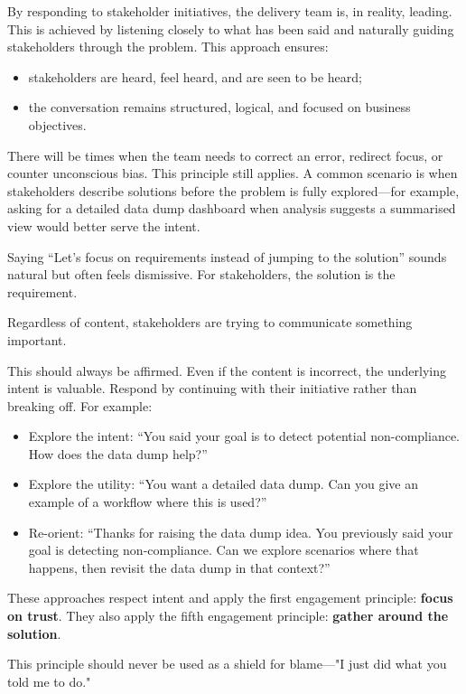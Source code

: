 \documentclass[10pt,openany,10pt]{book}
\providecommand{\tightlist}{%
  \setlength{\itemsep}{0pt}\setlength{\parskip}{0pt}}
\begin{document}
By responding to stakeholder initiatives, the delivery team is, in
reality, leading. This is achieved by listening closely to what has been
said and naturally guiding stakeholders through the problem. This
approach ensures:

\begin{itemize}
\tightlist
\item
  stakeholders are heard, feel heard, and are seen to be heard;
\item
  the conversation remains structured, logical, and focused on business
  objectives.
\end{itemize}

There will be times when the team needs to correct an error, redirect
focus, or counter unconscious bias. This principle still applies. A
common scenario is when stakeholders describe solutions before the
problem is fully explored---for example, asking for a detailed data dump
dashboard when analysis suggests a summarised view would better serve
the intent.

Saying ``Let's focus on requirements instead of jumping to the
solution'' sounds natural but often feels dismissive. For stakeholders,
the solution is the requirement.

Regardless of content, stakeholders are trying to communicate something
important.

This should always be affirmed. Even if the content is incorrect, the
underlying intent is valuable. Respond by continuing with their
initiative rather than breaking off. For example:

\begin{itemize}
\item
  Explore the intent: ``You said your goal is to detect potential
  non-compliance. How does the data dump help?''
\item
  Explore the utility: ``You want a detailed data dump. Can you give an
  example of a workflow where this is used?''
\item
  Re-orient: ``Thanks for raising the data dump idea. You previously
  said your goal is detecting non-compliance. Can we explore scenarios
  where that happens, then revisit the data dump in that context?''
\end{itemize}

These approaches respect intent and apply the first engagement
principle: \textbf{focus on trust}. They also apply the fifth engagement
principle: \textbf{gather around the solution}.

This principle should never be used as a shield for blame---"I just did
what you told me to do."
\end{document}
